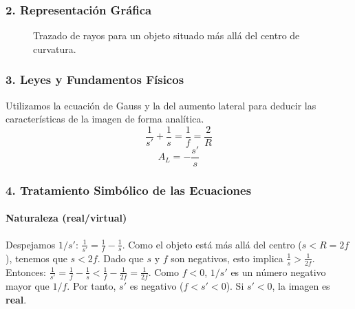\subsubsection*{2. Representación Gráfica}
\begin{figure}[H]
    \centering
    \caption{Trazado de rayos para un objeto situado más allá del centro de curvatura.}
\end{figure}

\subsubsection*{3. Leyes y Fundamentos Físicos}
Utilizamos la ecuación de Gauss y la del aumento lateral para deducir las características de la imagen de forma analítica.
$$\frac{1}{s'} + \frac{1}{s} = \frac{1}{f} = \frac{2}{R}$$
$$A_L = -\frac{s'}{s}$$

\subsubsection*{4. Tratamiento Simbólico de las Ecuaciones}
\paragraph*{Naturaleza (real/virtual)}
Despejamos $1/s'$: $\frac{1}{s'} = \frac{1}{f} - \frac{1}{s}$.
Como el objeto está más allá del centro ($s < R = 2f$), tenemos que $s < 2f$. Dado que $s$ y $f$ son negativos, esto implica $\frac{1}{s} > \frac{1}{2f}$.
Entonces: $\frac{1}{s'} = \frac{1}{f} - \frac{1}{s} < \frac{1}{f} - \frac{1}{2f} = \frac{1}{2f}$.
Como $f<0$, $1/s'$ es un número negativo mayor que $1/f$. Por tanto, $s'$ es negativo ($f < s' < 0$).
Si $s' < 0$, la imagen es \textbf{real}.

